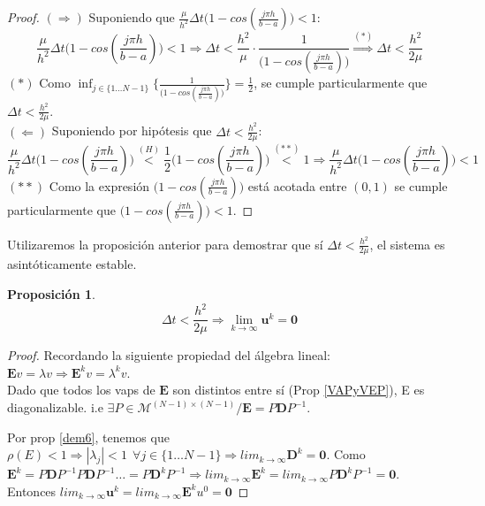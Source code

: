 \documentclass{endm}
\newtheorem{prop_es}{Proposición}
\begin{document}
\begin{proof}
$(\Rightarrow)$ Suponiendo que $\frac{\mu}{h^2}\Delta t\big(1-cos(\frac{j\pi h}{b-a})\big) < 1$:
\begin{equation}
    \frac{\mu}{h^2}\Delta t\big(1-cos(\frac{j\pi h}{b-a})\big) < 1 \Rightarrow
    \Delta t < \frac{h^2}{\mu}\cdot\frac{1}{\big(1-cos(\frac{j\pi h}{b-a})\big)} \overset{(*)}{\Rightarrow}
    \Delta t < \frac{h^2}{2\mu}
\end{equation}
$(*)$ Como $\inf_{j \in \{1\dots N-1\}}  \Bigg\{\frac{1}{\big(1-cos(\frac{j\pi h}{b-a})\big)}\Bigg\} = \frac{1}{2}$, se cumple particularmente que $\Delta t < \frac{h^2}{2\mu}$. \\
$(\Leftarrow)$ Suponiendo por hipótesis que $\Delta t < \frac{h^2}{2\mu}$:
\begin{equation}
    \frac{\mu}{h^2}\Delta t\big(1-cos(\frac{j\pi h}{b-a})\big) \overset{(H)}{<}
    \frac{1}{2}\big(1-cos(\frac{j\pi h}{b-a})\big) \overset{(**)}{<} 1
    \Rightarrow
    \frac{\mu}{h^2}\Delta t\big(1-cos(\frac{j\pi h}{b-a})\big) < 1
\end{equation}
$(**)$ Como la expresión $\big(1-cos(\frac{j\pi h}{b-a})\big)$ está acotada entre $(0,1)$ se cumple particularmente que $\big(1-cos(\frac{j\pi h}{b-a})\big) < 1$. \end{proof}
Utilizaremos la proposición anterior para demostrar que sí $\Delta t < \frac{h^2}{2\mu}$, el sistema es asintóticamente estable.
\begin{prop_es} \label{asintprop}
\begin{equation*}
    \Delta t < \frac{h^2}{2\mu} \Rightarrow \lim_{k\to\infty} \boldsymbol{u}^k = \boldsymbol{0}
\end{equation*}
\end{prop_es}
\begin{proof}
Recordando la siguiente propiedad del \'algebra lineal: $\boldsymbol{E}v = \lambda v \Rightarrow \boldsymbol{E}^k v = \lambda^k v$. \\
Dado que todos los vaps de $\boldsymbol{E}$ son distintos entre sí (Prop \ref{VAPyVEP}), E es diagonalizable. i.e $\exists P \in \mathcal{M}^{(N-1)\times(N-1)} / \boldsymbol{E} = P\boldsymbol{D}P^{-1}$.

Por prop \ref{dem6}, tenemos que $\rho(E) < 1 \Rightarrow |\lambda_j| < 1 \ \ \forall j \in \{1\dots N-1\} \Rightarrow lim_{k\to\infty} \boldsymbol{D}^k = \boldsymbol{0} $.
Como $\boldsymbol{E}^k = P\boldsymbol{D}P^{-1}P\boldsymbol{D}P^{-1}\dots = P\boldsymbol{D}^kP^{-1} \Rightarrow lim_{k\to\infty} \boldsymbol{E}^k = lim_{k\to\infty} P\boldsymbol{D}^kP^{-1} = \boldsymbol{0} $.\\
Entonces $lim_{k\to\infty} \boldsymbol{u}^k = lim_{k\to\infty} \boldsymbol{E}^ku^0 = \boldsymbol{0}$
\end{proof}
\end{document}
